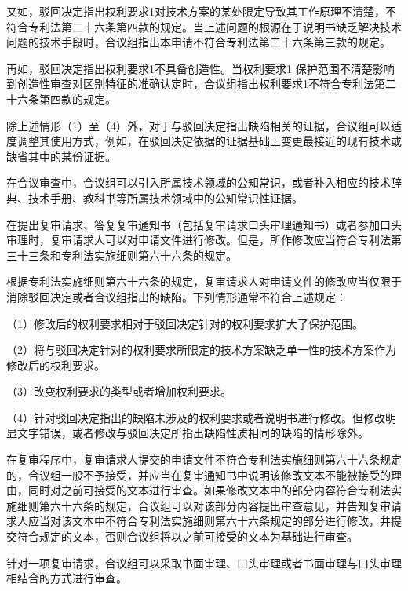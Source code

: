 又如，驳回决定指出权利要求1对技术方案的某处限定导致其工作原理不清楚，不符合专利法第二十六条第四款的规定。当上述问题的根源在于说明书缺乏解决技术问题的技术手段时，合议组指出本申请不符合专利法第二十六条第三款的规定。

再如，驳回决定指出权利要求1不具备创造性。当权利要求1 保护范围不清楚影响到创造性审查对区别特征的准确认定时，合议组指出权利要求1不符合专利法第二十六条第四款的规定。

除上述情形（1）至（4）外，对于与驳回决定指出缺陷相关的证据，合议组可以适度调整其使用方式，例如，在驳回决定依据的证据基础上变更最接近的现有技术或缺省其中的某份证据。

在合议审查中，合议组可以引入所属技术领域的公知常识，或者补入相应的技术辞典、技术手册、教科书等所属技术领域中的公知常识性证据。

在提出复审请求、答复复审通知书（包括复审请求口头审理通知书）或者参加口头审理时，复审请求人可以对申请文件进行修改。但是，所作修改应当符合专利法第三十三条和专利法实施细则第六十六条的规定。

根据专利法实施细则第六十六条的规定，复审请求人对申请文件的修改应当仅限于消除驳回决定或者合议组指出的缺陷。下列情形通常不符合上述规定：

{\setlength{\parindent}{17.1bp}（1）修改后的权利要求相对于驳回决定针对的权利要求扩大了保护范围。\par}

{\setlength{\parindent}{17.1bp}（2）将与驳回决定针对的权利要求所限定的技术方案缺乏单一性的技术方案作为修改后的权利要求。\par}

{\setlength{\parindent}{17.1bp}（3）改变权利要求的类型或者增加权利要求。\par}

{\setlength{\parindent}{17.1bp}（4）针对驳回决定指出的缺陷未涉及的权利要求或者说明书进行修改。但修改明显文字错误，或者修改与驳回决定所指出缺陷性质相同的缺陷的情形除外。\par}

在复审程序中，复审请求人提交的申请文件不符合专利法实施细则第六十六条规定的，合议组一般不予接受，并应当在复审通知书中说明该修改文本不能被接受的理由，同时对之前可接受的文本进行审查。如果修改文本中的部分内容符合专利法实施细则第六十六条的规定，合议组可以对该部分内容提出审查意见，并告知复审请求人应当对该文本中不符合专利法实施细则第六十六条规定的部分进行修改，并提交符合规定的文本，否则合议组将以之前可接受的文本为基础进行审查。

针对一项复审请求，合议组可以采取书面审理、口头审理或者书面审理与口头审理相结合的方式进行审查。

